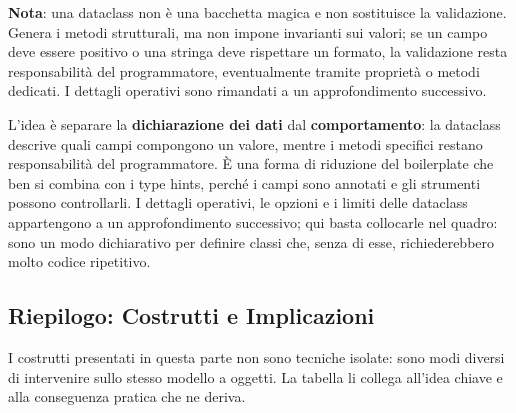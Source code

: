\documentclass[12pt]{extarticle}
\begin{document}
\noindent \textbf{Nota}: una dataclass non è una bacchetta magica e non sostituisce la validazione. Genera i metodi strutturali, ma non impone invarianti sui valori; se un campo deve essere positivo o una stringa deve rispettare un formato, la validazione resta responsabilità del programmatore, eventualmente tramite proprietà o metodi dedicati. I dettagli operativi sono rimandati a un approfondimento successivo.

\noindent L'idea è separare la \textbf{dichiarazione dei dati} dal \textbf{comportamento}: la dataclass descrive quali campi compongono un valore, mentre i metodi specifici restano responsabilità del programmatore. È una forma di riduzione del boilerplate che ben si combina con i type hints, perché i campi sono annotati e gli strumenti possono controllarli. I dettagli operativi, le opzioni e i limiti delle dataclass appartengono a un approfondimento successivo; qui basta collocarle nel quadro: sono un modo dichiarativo per definire classi che, senza di esse, richiederebbero molto codice ripetitivo.

\subsection{Riepilogo: Costrutti e Implicazioni}

\noindent I costrutti presentati in questa parte non sono tecniche isolate: sono modi diversi di intervenire sullo stesso modello a oggetti. La tabella li collega all'idea chiave e alla conseguenza pratica che ne deriva.
\end{document}
